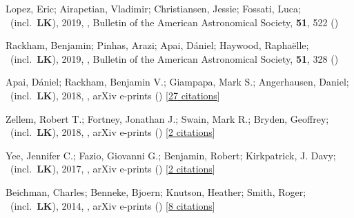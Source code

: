 \item[{\color{numcolor}\scriptsize6}] Lopez, Eric; Airapetian, Vladimir; Christiansen, Jessie; Fossati, Luca; \etal\ (incl.\ \textbf{LK}), 2019, , Bulletin of the American Astronomical Society, \textbf{51}, 522 ()

\item[{\color{numcolor}\scriptsize5}] Rackham, Benjamin; Pinhas, Arazi; Apai, D{\'a}niel; Haywood, Rapha{\"e}lle; \etal\ (incl.\ \textbf{LK}), 2019, , Bulletin of the American Astronomical Society, \textbf{51}, 328 ()

\item[{\color{numcolor}\scriptsize4}] Apai, D{\'a}niel; Rackham, Benjamin V.; Giampapa, Mark S.; Angerhausen, Daniel; \etal\ (incl.\ \textbf{LK}), 2018, , arXiv e-prints () [\href{https://ui.adsabs.harvard.edu/abs/2018arXiv180308708A}{27 citations}]

\item[{\color{numcolor}\scriptsize3}] Zellem, Robert T.; Fortney, Jonathan J.; Swain, Mark R.; Bryden, Geoffrey; \etal\ (incl.\ \textbf{LK}), 2018, , arXiv e-prints () [\href{https://ui.adsabs.harvard.edu/abs/2018arXiv180307163Z}{2 citations}]

\item[{\color{numcolor}\scriptsize2}] Yee, Jennifer C.; Fazio, Giovanni G.; Benjamin, Robert; Kirkpatrick, J. Davy; \etal\ (incl.\ \textbf{LK}), 2017, , arXiv e-prints () [\href{https://ui.adsabs.harvard.edu/abs/2017arXiv171004194Y}{2 citations}]

\item[{\color{numcolor}\scriptsize1}] Beichman, Charles; Benneke, Bjoern; Knutson, Heather; Smith, Roger; \etal\ (incl.\ \textbf{LK}), 2014, , arXiv e-prints () [\href{https://ui.adsabs.harvard.edu/abs/2014arXiv1411.1754B}{8 citations}]